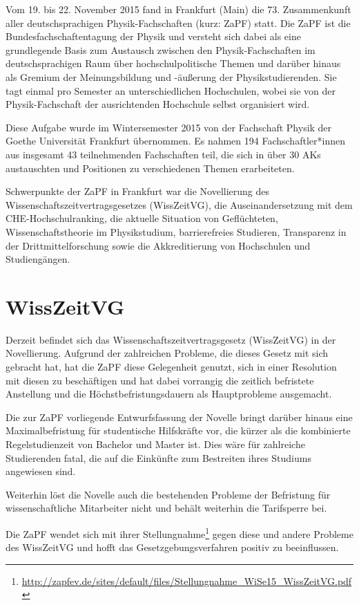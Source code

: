 Vom 19. bis 22. November 2015 fand in Frankfurt (Main) die 73. Zusammenkunft aller deutschsprachigen Physik-Fachschaften (kurz: ZaPF) statt.
Die ZaPF ist die Bundesfachschaftentagung der Physik und versteht sich dabei als eine grundlegende Basis zum Austausch zwischen den Physik-Fachschaften im deutschsprachigen Raum über hochschulpolitische Themen und darüber hinaus als Gremium der Meinungsbildung und -äußerung der Physikstudierenden. Sie tagt einmal pro Semester an unterschiedlichen Hochschulen, wobei sie von der Physik-Fachschaft der ausrichtenden Hochschule selbst organisiert wird.

Diese Aufgabe wurde im Wintersemester 2015 von der Fachschaft Physik der Goethe Universität Frankfurt übernommen. Es nahmen 194 Fachschaftler*innen aus insgesamt 43 teilnehmenden Fachschaften teil, die sich in über 30 AKs austauschten und Positionen zu verschiedenen Themen erarbeiteten.

Schwerpunkte der ZaPF in Frankfurt war die Novellierung des Wissenschaftszeitvertragsgesetzes (WissZeitVG), die Auseinandersetzung mit dem CHE-Hochschulranking, die aktuelle Situation von Geflüchteten, Wissenschaftstheorie im Physikstudium, barrierefreies Studieren, Transparenz in der Drittmittelforschung sowie die Akkreditierung von Hochschulen und Studiengängen.

\newpage

\section*{WissZeitVG}
Derzeit befindet sich das Wissenschaftszeitvertragsgesetz (WissZeitVG) in der Novellierung. Aufgrund der zahlreichen Probleme, die dieses Gesetz mit sich gebracht hat, hat die ZaPF diese Gelegenheit genutzt, sich in einer Resolution mit diesen zu beschäftigen und hat dabei  vorrangig die zeitlich befristete Anstellung und die Höchstbefristungsdauern als Hauptprobleme ausgemacht.

Die zur ZaPF vorliegende Entwurfsfassung der Novelle bringt darüber hinaus eine Maximalbefristung für studentische Hilfskräfte vor, die kürzer als die kombinierte Regelstudienzeit von Bachelor und Master ist. Dies wäre für zahlreiche Studierenden fatal, die auf die Einkünfte zum Bestreiten ihres Studiums angewiesen sind.

Weiterhin löst die Novelle auch die bestehenden Probleme der Befristung für  wissenschaftliche Mitarbeiter nicht und behält weiterhin die Tarifsperre bei.

Die ZaPF wendet sich mit ihrer Stellungnahme\footnote{\href{http://zapfev.de/sites/default/files/Stellungnahme\_WiSe15\_WissZeitVG.pdf}{\url{http://zapfev.de/sites/default/files/Stellungnahme\_WiSe15\_WissZeitVG.pdf}}} gegen diese und andere Probleme des WissZeitVG und hofft das Gesetzgebungsverfahren positiv zu beeinflussen.

